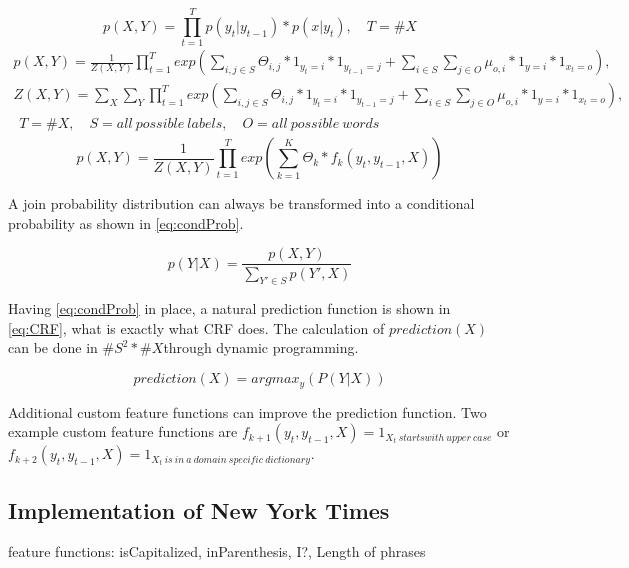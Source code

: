 \documentclass[12pt, twoside]{report}
\begin{document}
\begin{equation} \label{eq:jointProb}
p(X,Y) = \prod_{t=1}^T p(y_t|y_{t-1}) * p(x|y_t), \quad T = \#X
\end{equation}
\begin{equation} \label{eq:magicTransoformation}\begin{split}
p(X,Y) = \frac{1}{Z(X,Y)}\prod_{t=1}^T exp(\sum_{i,j\in S}^{} \Theta_{i,j} * 1_{y_t=i} * 1_{y_{t-1}=j} + \sum_{i \in S}^{} \sum_{j \in O}^{} \mu_{o,i} * 1_{y=i} * 1_{x_t=o}),
\\
Z(X,Y) = \sum_{X}^{}\sum_{Y}^{}\prod_{t=1}^T exp(\sum_{i,j\in S}^{} \Theta_{i,j} * 1_{y_t=i} * 1_{y_{t-1}=j} + \sum_{i \in S}^{} \sum_{j \in O}^{} \mu_{o,i} * 1_{y=i} * 1_{x_t=o}),
\\ \begin{flalign}
T = \#X, \quad S = all\ possible\ labels, \quad O = all\ possible\ words
\end{flalign}
\end{split}\end{equation}
\begin{equation} \label{eq:smartIndexing}
p(X,Y) = \frac{1}{Z(X,Y)}\prod_{t=1}^T exp(\sum_{k=1}^{K} \Theta_{k} * f_k(y_t, y_{t-1}, X))
\end{equation}

A join probability distribution can always be transformed into a conditional probability as shown in \cref{eq:condProb}.

\begin{equation}\label{eq:condProb}
p(Y|X) = \frac{p(X,Y)}{\sum_{Y'\in S}^{}p(Y', X)}
\end{equation}

Having \cref{eq:condProb} in place, a natural prediction function is shown in \cref{eq:CRF}, what is exactly what CRF does. The calculation of $prediction(X)$ can be done in $\#S^2*\#X$through dynamic programming.

\begin{equation}\label{eq:CRF}
prediction(X) = argmax_y(P(Y|X))
\end{equation}

Additional custom feature functions can improve the prediction function. Two example custom feature functions are $f_{k+1}(y_t, y_{t-1}, X) = 1_{X_t\ starts with\ upper\ case}$ or \\ $f_{k+2}(y_t, y_{t-1}, X) = 1_{X_t\ is\ in\ a\ domain\ specific\ dictionary}$.

\subsection{Implementation of New York Times}
feature functions: isCapitalized, inParenthesis, I?, Length of phrases
\end{document}
